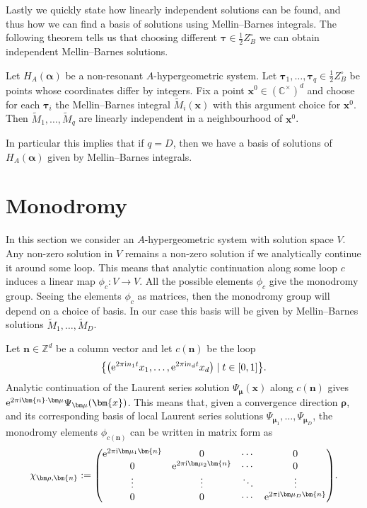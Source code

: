 Lastly we quickly state how linearly independent solutions can be found, and thus how we can find a basis of solutions using Mellin--Barnes integrals. The following theorem tells us that choosing different $\bm\tau\in\frac12 Z_B^\circ$ we can obtain independent Mellin--Barnes solutions.

\begin{Theorem} %
Let $H_A(\bm{\alpha})$ be a non-resonant $A$-hypergeometric system. Let
$\bm{\tau}_1,\dots,\bm{\tau}_q \in \frac{1}{2}Z_B^{\circ}$ be points whose coordinates
differ by integers. Fix a point $\bm{x}^0\in(\mathbb{C}^\times)^d$
and choose for each $\bm\tau_i$ the
Mellin--Barnes integral $\tilde{M}_i(\bm{x})$ with this argument choice for $\bm{x}^0$.
Then $\tilde{M}_1,\dots,\tilde{M}_q$ are linearly independent in a neighbourhood of $\bm{x}^0$.
\end{Theorem}
In particular this implies that if $q=D$, then we have a basis of solutions of
$H_A(\bm\alpha)$ given by Mellin--Barnes integrals.

\section{Monodromy}
\label{chap-mon}
In this section we consider an $A$-hypergeometric system with solution space $V$. Any non-zero solution in $V$ remains a non-zero solution if we analytically continue it around some loop.
This means that analytic continuation along some loop $c$ induces a linear map
$\phi_{c}\colon V \rightarrow V$.
All the possible elements $\phi_{c}$ give the monodromy group.
Seeing the elements $\phi_{c}$ as matrices, then the monodromy group will depend on a choice of basis. In our case this basis will be given by Mellin--Barnes solutions $\tilde{M}_1,\dots,\tilde{M}_D$.

Let $\bm{n} \in \mathbb{Z}^d$ be a column vector and let $c(\bm{n})$ be the loop
\begin{gather*}
\big\{\big({\rm e}^{2\pi {\rm i} n_1 t}x_1,\dots,{\rm e}^{2\pi {\rm i} n_d t}x_d\big)\mid t \in [0,1]\big\}.
\end{gather*}
Analytic
continuation of the Laurent series solution $\Psi_{\bm{\mu}}(\bm{x})$ along $c(\bm{n})$
gives ${\rm e}^{2\pi {\rm i} \bm{n} \cdot \bm\mu}\Psi_{\bm\mu}(\bm{x})$. This means that, given a convergence direction $\bm\rho$, and its corresponding basis of local Laurent series solutions
$\Psi_{\bm\mu_1},\dots,\Psi_{\bm\mu_D}$, the monodromy elements $\phi_{c(\bm{n})}$ can be written in matrix form as
\begin{gather*}
\chi_{\bm\rho,\bm{n}} := \begin{pmatrix}{\rm e}^{2\pi {\rm i} \bm\mu_1 \bm{n}} & 0 & \cdots & 0 \\ 0 & {\rm e}^{2\pi {\rm i} \bm\mu_2 \bm{n}} & \cdots & 0 \\ \vdots & \vdots & \ddots & \vdots \\ 0 & 0 & \cdots & {\rm e}^{2\pi {\rm i} \bm\mu_D \bm{n}}\end{pmatrix}\!.
\end{gather*}

